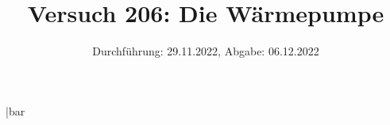 
\usepackage{pdfpages}
\newcommand*\diff{\mathop{}\!\mathrm{d}}
\newcommand*\Diff[1]{\mathop{}\!\mathrm{d^#1}} %
\DeclareSIUnit\bar{bar}

\title{Versuch 206: Die Wärmepumpe}
\date{Durchführung: 29.11.2022, Abgabe: 06.12.2022}



\maketitle

\thispagestyle{empty} 
\tableofcontents
\newpage

\setcounter{page}{1}









\printbibliography

\newpage


